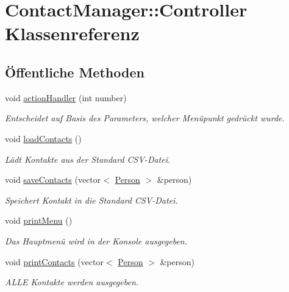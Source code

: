 \hypertarget{classContactManager_1_1Controller}{}\section{Contact\+Manager\+:\+:Controller Klassenreferenz}
\label{classContactManager_1_1Controller}
\subsection*{Öffentliche Methoden}
\begin{DoxyCompactItemize}
\item 
void \hyperlink{classContactManager_1_1Controller_afd2e274df3edef5ab0abf90aae5ad21c}{action\+Handler} (int number)
\begin{DoxyCompactList}\small\item\em Entscheidet auf Basis des Parameters, welcher Menüpunkt gedrückt wurde.\end{DoxyCompactList}\item 
void \hyperlink{classContactManager_1_1Controller_a5b020c2e4726dc2e50fc14b4ac53b3d9}{load\+Contacts} ()
\begin{DoxyCompactList}\small\item\em Lädt Kontakte aus der Standard C\+S\+V-\/\+Datei.\end{DoxyCompactList}\item 
void \hyperlink{classContactManager_1_1Controller_a9e9c1932416993fd47fcf77601fa7974}{save\+Contacts} (vector$<$ \hyperlink{classContactManager_1_1Person}{Person} $>$ \&person)
\begin{DoxyCompactList}\small\item\em Speichert Kontakt in die Standard C\+S\+V-\/\+Datei.\end{DoxyCompactList}\item 
void \hyperlink{classContactManager_1_1Controller_ab36756f7c338b7f7d31fe74ad48f059d}{print\+Menu} ()
\begin{DoxyCompactList}\small\item\em Das Hauptmenü wird in der Konsole ausgegeben.\end{DoxyCompactList}\item 
void \hyperlink{classContactManager_1_1Controller_abd46b513b9d71e896fa3187e616aa805}{print\+Contacts} (vector$<$ \hyperlink{classContactManager_1_1Person}{Person} $>$ \&person)
\begin{DoxyCompactList}\small\item\em A\+L\+LE Kontakte werden ausgegeben.\end{DoxyCompactList}\item 

\end{DoxyCompactItemize}
